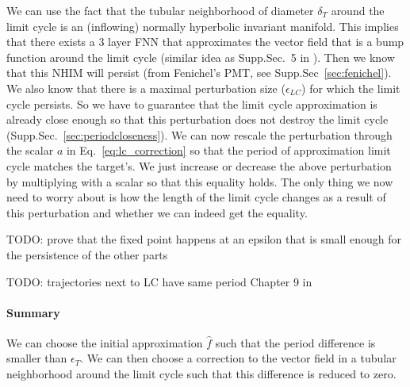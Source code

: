 \documentclass{article}
\theoremstyle{definition}
\theoremstyle{remark}
\newcounter{ct}
\begin{document}
We can use the fact that the tubular neighborhood of diameter $\delta_T$ around the limit cycle is an (inflowing) normally hyperbolic invariant manifold.
This implies that there exists a 3 layer FNN that approximates the vector field that is a bump function around the limit cycle (similar idea as Supp.Sec.~5 in \citep{Sagodi2024a}). %
Then we know that this NHIM will persist (from Fenichel's PMT, see Supp.Sec~\ref{sec:fenichel}).
We also know that there is a maximal perturbation size ($\epsilon_{LC}$) for which the limit cycle persists.
So we have to guarantee that the limit cycle approximation is already close enough so that this perturbation does not destroy the limit cycle (Supp.Sec.~\ref{sec:periodcloseness}). %
We can now rescale the perturbation through the scalar $a$ in Eq.~\ref{eq:lc_correction} so that the period of approximation limit cycle matches the target's. 
We just increase or decrease  the above perturbation by multiplying with a scalar so that this equality holds.
The only thing we now need to worry about is how the length of the limit cycle changes as a result of this perturbation and whether we can indeed get the equality.


TODO: prove that the fixed point happens at an epsilon that is small enough for the persistence of the other parts

TODO: trajectories next to LC have same period Chapter 9 in \citep{ermentrout2010mathematical}




\paragraph{Summary}
We can choose the initial approximation $\hat{f}$ such that the period difference is smaller than $\epsilon_T$.
We can then choose a correction to the vector field in a tubular neighborhood around the limit cycle such that this difference is reduced to zero.
\end{document}
